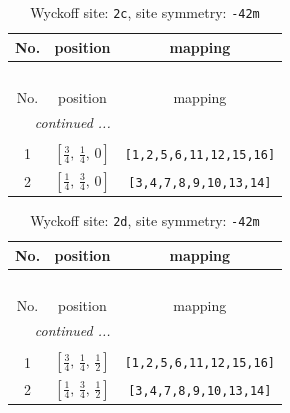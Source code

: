 \documentclass[fleqn,8pt]{jsarticle}
\begin{document}
\renewcommand{\arraystretch}{1.2}
\begin{longtable}{ccc}
\caption{Wyckoff site: {\tt 2c}, site symmetry: {\tt -42m}}
 \\
 \hline \hline
No. & position & mapping \\ \hline \endfirsthead

\multicolumn{2}{l}{\tablename\ \thetable{}} \\
 \hline \hline
No. & position & mapping \\ \hline \endhead

 \hline \hline
\multicolumn{2}{r}{\footnotesize\it continued ...} \\ \endfoot

 \hline \hline
\multicolumn{2}{r}{} \\ \endlastfoot

1 & $\left[ \frac{3}{4},\, \frac{1}{4},\, 0 \right]$ & {\tt [1,2,5,6,11,12,15,16]} \\ \hline
2 & $\left[ \frac{1}{4},\, \frac{3}{4},\, 0 \right]$ & {\tt [3,4,7,8,9,10,13,14]} \\
\end{longtable}
\renewcommand{\arraystretch}{1.2}
\begin{longtable}{ccc}
\caption{Wyckoff site: {\tt 2d}, site symmetry: {\tt -42m}}
 \\
 \hline \hline
No. & position & mapping \\ \hline \endfirsthead

\multicolumn{2}{l}{\tablename\ \thetable{}} \\
 \hline \hline
No. & position & mapping \\ \hline \endhead

 \hline \hline
\multicolumn{2}{r}{\footnotesize\it continued ...} \\ \endfoot

 \hline \hline
\multicolumn{2}{r}{} \\ \endlastfoot

1 & $\left[ \frac{3}{4},\, \frac{1}{4},\, \frac{1}{2} \right]$ & {\tt [1,2,5,6,11,12,15,16]} \\ \hline
2 & $\left[ \frac{1}{4},\, \frac{3}{4},\, \frac{1}{2} \right]$ & {\tt [3,4,7,8,9,10,13,14]} \\
\end{longtable}
\renewcommand{\arraystretch}{1.2}
\end{document}
